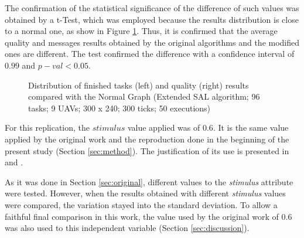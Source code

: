 The confirmation of the statistical significance of the difference of such values was obtained by a t-Test, which was employed because the results distribution is close to a normal one, as show in Figure \ref{fig:fig07}. Thus, it is confirmed that the average quality and messages results obtained by the original algorithms and the modified ones are different. The test confirmed the difference with a confidence interval of $0.99$ and $p-val<0.05$. 

\begin{figure}[!htb]
\centering
{}
\quad
{}
\caption{Distribution of finished tasks (left) and quality (right) results compared with the Normal Graph (Extended SAL algorithm; 96 tasks; 9 UAVs; 300 x 240; 300 ticks; 50 executions)}
\label{fig:fig07}
\end{figure}

For this replication, the $stimulus$ value applied was of $0.6$. It is the same value applied by the original work and the reproduction done in the beginning of the present study (Section \ref{sec:method}). The justification of its use is presented in \cite{MAS07} and \cite{ferreira2007swarm}.

As it was done in Section \ref{sec:original}, different values to the \textit{stimulus} attribute were tested. However, when the results obtained with different \textit{stimulus} values were compared, the variation stayed into the standard deviation. To allow a faithful final comparison in this work, the value used by the original work \cite{MAS07} of $0.6$ was also used to this independent variable (Section \ref{sec:discussion}).
